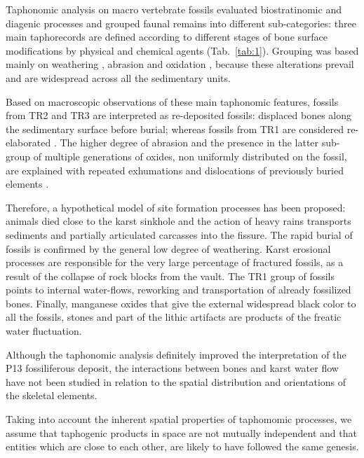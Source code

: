 \documentclass[review,authoryear]{elsarticle} %
\begin{document}
Taphonomic analysis \citep{Bagnus2011} on macro vertebrate fossils evaluated biostratinomic and diagenic processes and grouped faunal remains into different sub-categories: three main taphorecords \citep[TR's, \emph{sensu}][]{Fernandez-Lopez1987} are defined according to different stages of bone surface modifications by physical and chemical agents (Tab.~\ref{tab:1}). Grouping was based mainly on weathering \citep{Behrensmeyer1978,Diez1999,Kos2003,Torres2003}, abrasion \citep{Behrensmeyer1991} and oxidation \citep{Hill1982,Lopez-Gonzalez2006,White1976,White2009}, because these alterations prevail and are widespread across all the sedimentary units.

Based on macroscopic observations of these main taphonomic features, fossils from TR2 and TR3 are interpreted as re-deposited fossils: displaced bones along the sedimentary surface before burial; whereas fossils from TR1 are considered re-elaborated \citep[\emph{sensu}][]{Fernandez-Lopez1991,Fernandez-Lopez2007,Fernandez-Lopez2011}. The higher degree of abrasion and the presence in the latter sub-group of multiple generations of oxides, non uniformly distributed on the fossil, are explained with repeated exhumations and dislocations of previously buried elements \citep{Lopez-Gonzalez2006}.

Therefore, a hypothetical model of site formation processes has been proposed: animals died close to the karst sinkhole and the action of heavy rains transports sediments and partially articulated carcasses into the fissure. The rapid burial of fossils is confirmed by the general low degree of weathering. Karst erosional processes are responsible for the very large percentage of fractured fossils, as a result of the collapse of rock blocks from the vault. The TR1 group of fossils points to internal water-flows, reworking and transportation of already fossilized bones. Finally, manganese oxides that give the external widespread black color to all the fossils, stones and part of the lithic artifacts are products of the freatic water fluctuation.

Although the taphonomic analysis definitely improved the interpretation of the P13 fossiliferous deposit, the interactions between bones and karst water flow have not been studied in relation to the spatial distribution and orientations of the skeletal elements.

Taking into account the inherent spatial properties of taphomomic processes, we assume that taphogenic products \citep[\emph{sensu}][]{Fernandez-Lopez2000} in space are not mutually independent and that entities which are close to each other, are likely to have followed the same genesis.
\end{document}
